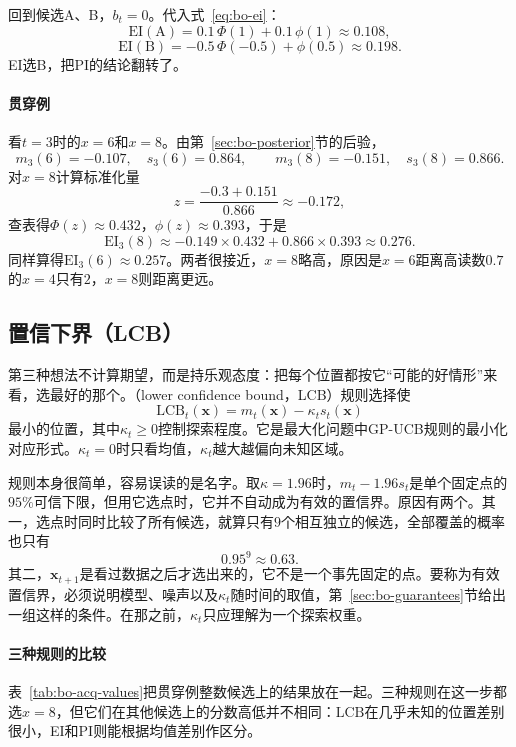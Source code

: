 回到候选A、B，$b_t=0$。代入式~\eqref{eq:bo-ei}：
\[
 \mathrm{EI}(\text{A})=0.1\,\Phi(1)+0.1\,\phi(1)\approx0.108,
\]
\[
 \mathrm{EI}(\text{B})=-0.5\,\Phi(-0.5)+\phi(0.5)\approx0.198.
\]
EI选B，把PI的结论翻转了。

\paragraph{贯穿例}
看$t=3$时的$x=6$和$x=8$。由第~\ref{sec:bo-posterior}节的后验，
\[
 m_3(6)=-0.107,\quad s_3(6)=0.864,\qquad
 m_3(8)=-0.151,\quad s_3(8)=0.866.
\]
对$x=8$计算标准化量
\[
 z=\frac{-0.3+0.151}{0.866}\approx-0.172,
\]
查表得$\Phi(z)\approx0.432$，$\phi(z)\approx0.393$，于是
\[
 \mathrm{EI}_3(8)\approx-0.149\times0.432+0.866\times0.393\approx0.276.
\]
同样算得$\mathrm{EI}_3(6)\approx0.257$。两者很接近，$x=8$略高，原因是$x=6$距离高读数$0.7$的$x=4$只有$2$，$x=8$则距离更远。

\subsection{置信下界（LCB）}
\label{sec:bo-lcb}

第三种想法不计算期望，而是持乐观态度：把每个位置都按它“可能的好情形”来看，选最好的那个。（lower confidence bound，LCB）规则选择使
\begin{equation}
 \mathrm{LCB}_t(\bm{x})=m_t(\bm{x})-\kappa_ts_t(\bm{x})
 \label{eq:bo-lcb}
\end{equation}
最小的位置，其中$\kappa_t\geq0$控制探索程度。它是最大化问题中GP-UCB规则的最小化对应形式。$\kappa_t=0$时只看均值，$\kappa_t$越大越偏向未知区域。

规则本身很简单，容易误读的是名字。取$\kappa=1.96$时，$m_t-1.96s_t$是单个固定点的$95\%$可信下限，但用它选点时，它并不自动成为有效的置信界。原因有两个。其一，选点时同时比较了所有候选，就算只有$9$个相互独立的候选，全部覆盖的概率也只有
\[
 0.95^9\approx0.63.
\]
其二，$\bm{x}_{t+1}$是看过数据之后才选出来的，它不是一个事先固定的点。要称为有效置信界，必须说明模型、噪声以及$\kappa_t$随时间的取值，第~\ref{sec:bo-guarantees}节给出一组这样的条件。在那之前，$\kappa_t$只应理解为一个探索权重。

\paragraph{三种规则的比较}
表~\ref{tab:bo-acq-values}把贯穿例整数候选上的结果放在一起。三种规则在这一步都选$x=8$，但它们在其他候选上的分数高低并不相同：$\mathrm{LCB}$在几乎未知的位置差别很小，EI和PI则能根据均值差别作区分。


